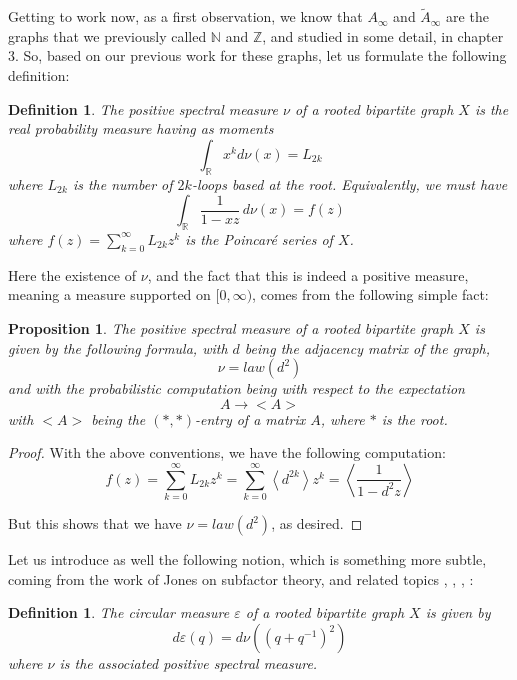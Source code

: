 \documentclass[12pt]{amsbook}
\newtheorem{definition}[theorem]{Definition}
\newtheorem{proposition}[theorem]{Proposition}
\begin{document}
Getting to work now, as a first observation, we know that $A_\infty$ and $\tilde{A}_\infty$ are the graphs that we previously called $\mathbb N$ and $\mathbb Z$, and studied in some detail, in chapter 3. So, based on our previous work for these graphs, let us formulate the following definition:


\begin{definition}
The positive spectral measure $\nu$ of a rooted bipartite graph $X$ is the real probability measure having as moments
$$\int_\mathbb Rx^kd\nu(x)=L_{2k}$$
where $L_{2k}$ is the number of $2k$-loops based at the root. Equivalently, we must have
$$\int_\mathbb R\frac{1}{1-xz}\,d\nu(x)=f(z)$$
where $f(z)=\sum_{k=0}^\infty L_{2k}z^k$ is the Poincar\'e series of $X$.
\end{definition}

Here the existence of $\nu$, and the fact that this is indeed a positive measure, meaning a measure supported on $[0,\infty)$, comes from the following simple fact:

\begin{proposition}
The positive spectral measure of a rooted bipartite graph $X$ is given by the following formula, with $d$ being the adjacency matrix of the graph,
$$\nu=law(d^2)$$
and with the probabilistic computation being with respect to the expectation 
$$A\to<A>$$
with $<A>$ being the $(*,*)$-entry of a matrix $A$, where $*$ is the root.
\end{proposition}

\begin{proof}
With the above conventions, we have the following computation:
$$f(z)
=\sum_{k=0}^\infty L_{2k}z^k
=\sum_{k=0}^\infty\left<d^{2k}\right>z^k
=\left<\frac{1}{1-d^2z}\right>$$

But this shows that we have $\nu=law(d^2)$, as desired.
\end{proof}

Let us introduce as well the following notion, which is something more subtle, coming from the work of Jones on subfactor theory, and related topics \cite{jo1}, \cite{jo2}, \cite{jo3}, \cite{jo4}:


\begin{definition}
The circular measure $\varepsilon$ of a rooted bipartite graph $X$ is given by
$$d\varepsilon(q)=d\nu((q+q^{-1})^2)$$
where $\nu$ is the associated positive spectral measure.
\end{definition}
\end{document}
